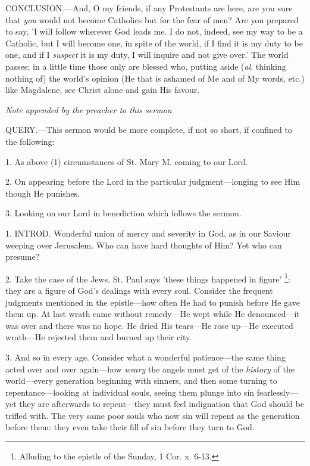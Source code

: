 CONCLUSION.—And,
O my friends, if any Protestants are here, are you sure that \emph{you}
would not become Catholics but for the fear of men? Are you prepared
to say, 'I will follow wherever God leads me. I do not, indeed, see my
way to be a Catholic, but I will become one, in spite of the world, if
I find it is my duty to be one, and if I \emph{suspect} it is my duty,
I will inquire and not give over.' The world passes; in a little time
those only are blessed who, putting aside (\emph{al}. thinking nothing
of) the world's opinion (He that is ashamed of Me and of My words,
etc.) like Magdalene, see Christ alone and gain His favour.

\emph{Note
appended by the preacher to this sermon}

QUERY.—This
sermon would be more complete, if not so short, if confined to the
following:

1. As above (1) circumstances of St. Mary M.
coming to our Lord.

2. On appearing before the Lord in the particular judgment—longing
to see Him though He punishes.

3. Looking on our Lord in benediction which follows the sermon.


1. INTROD.
Wonderful union of mercy and severity in God, as in our Saviour
weeping over Jerusalem. Who can have hard thoughts of Him? Yet who can
presume?

2. Take the case of the Jews. St. Paul says
'these things happened in figure' \footnote{Alluding to the epistle
of the Sunday, 1 Cor. x. 6-13.}: they are a figure of God's dealings with every soul. Consider
the frequent judgments mentioned in the epistle—how often He had to
punish before He gave them up. At last wrath came without remedy—He
wept while He denounced—it was over and there was no hope. He dried
His tears—He rose up—He executed wrath—He rejected them and
burned up their city.

3. And so in every age. Consider what a wonderful
patience—the same thing acted over and over again—how \emph{weary}
the angels must get of the \emph{history} of the world—every
generation beginning with sinners, and then some turning to
repentance—looking at individual souls, seeing them plunge into sin
fearlessly—yet they are afterwards to repent—they must feel
indignation that God should be trifled with. The very same poor souls
who now sin will repent as the generation before them: they even take
their fill of sin before they turn to God.

